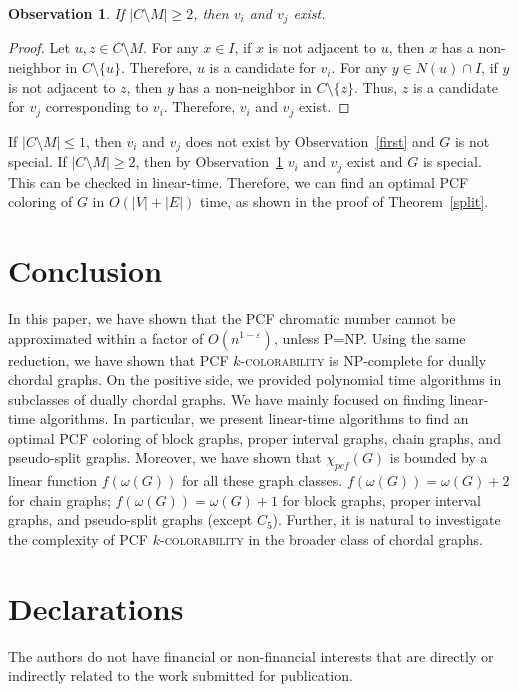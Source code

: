 \documentclass[11pt]{article}
\theoremstyle{plain}
\newtheorem{obs}{Observation}
\begin{document}
\begin{obs}\label{second}
	If $|C\setminus M|\geq2$, then $v_i$ and $v_j$ exist.
\end{obs}
\begin{proof}
	Let $u, z\in C\setminus M$. For any $x\in I$, if $x$ is not adjacent to $u$, then $x$ has a non-neighbor in $C\setminus\{u\}$. Therefore, $u$ is a candidate for $v_i$. For any $y\in N(u)\cap I$, if $y$ is not adjacent to $z$, then $y$ has a non-neighbor in $C\setminus\{z\}$. Thus, $z$ is a candidate for $v_j$ corresponding to $v_i$.
	Therefore, $v_i$ and $v_j$ exist.
\end{proof}

If $|C\setminus M| \leq 1$, then $v_i$ and $v_j$ does not exist by Observation~\ref{first} and $G$ is not special. 
If $|C\setminus M| \geq 2$, then by Observation~\ref{second} $v_i$ and $v_j$ exist and $G$ is special. This can be checked in linear-time. Therefore, we can find an optimal PCF coloring of $G$ in $O(|V|+|E|)$ time, as shown in the proof of Theorem~\ref{split}.

\section{Conclusion}
In this paper, we have shown that the PCF chromatic number cannot be approximated within a factor of $O(n^{1-\varepsilon})$, unless P=NP. Using the same reduction, we have shown that PCF $k$-\textsc{colorability} is NP-complete for dually chordal graphs.
On the positive side, we provided polynomial time algorithms in subclasses of dually chordal graphs. We have mainly focused on finding linear-time algorithms. In particular, we present linear-time algorithms to find an optimal PCF coloring of block graphs, proper interval graphs, chain graphs, and pseudo-split graphs.
Moreover, we have shown that $\chi_{pcf}(G)$ is bounded by a linear function $f(\omega(G))$ for all these graph classes. $f(\omega(G))=\omega(G)+2$ for chain graphs; $f(\omega(G))=\omega(G)+1$ for block graphs, proper interval graphs, and pseudo-split graphs (except $C_5$). Further, it is natural to investigate the complexity of PCF $k$-\textsc{colorability} in the broader class of chordal graphs.




\section*{Declarations}

 The authors do not have financial or non-financial interests that are directly or indirectly related to the work submitted for publication.
\end{document}
